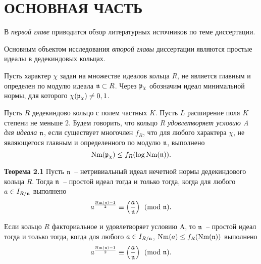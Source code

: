 \documentclass[_00_autoref.tex]{subfiles}
\begin{document}
{\let\clearpage\relax\vspace{2.2ex}
\chapter*{\MakeUppercase{ОСНОВНАЯ ЧАСТЬ}}\vspace{-2ex}}

В \emph{первой главе} приводится обзор литературных источников по теме диссертации.

Основным объектом исследования \emph{второй главы} диссертации являются простые идеалы в дедекиндовых кольцах.



Пусть характер $\chi$ задан на множестве идеалов кольца $R$, не является главным и определен по модулю идеала $\mathfrak{n} \subset R$.
Через $\mathfrak{p}_{\chi}$ обозначим идеал минимальной нормы, для которого $\chi(\mathfrak{p}_{\chi}) \neq 0, 1$.

Пусть $R$ дедекиндово кольцо с полем частных $K$.
Пусть $L$ расширение поля $K$ степени не меньше $2$.
Будем говорить, что кольцо $R$ \emph{удовлетворяет условию A для идеала $\mathfrak{n}$}, если существует многочлен $f_R$, что для любого характера $\chi$, не являющегося главным и определенного по модулю $\mathfrak{n}$, выполнено
\begin{equation*}
    \textrm{Nm}(\mathfrak{p}_{\chi}) \le f_R(\log{\textrm{Nm}(\mathfrak{n})}).
\end{equation*}

\textbf{Теорема 2.1}\label{theorem:euler_criteria}
    Пусть $\mathfrak{n}$~-- нетривиальный идеал нечетной нормы дедекиндового кольца $R$.
    Тогда $\mathfrak{n}$~-- простой идеал тогда и только тогда, когда для любого $a \in I_{R/\mathfrak{n}}$ выполнено
    \begin{equation*}
        a^{\frac{\textrm{Nm}(\mathfrak{n}) - 1}{2}} \equiv \left(\frac{a}{\mathfrak{n}}\right) \pmod{\mathfrak{n}}.
    \end{equation*}

    Если кольцо $R$ факториальное и удовлетворяет условию A, то $\mathfrak{n}$~-- простой идеал тогда и только тогда, когда для любого $a \in I_{R/\mathfrak{n}}$, $\textrm{Nm}(a) \le f_R(\textrm{Nm}(\mathfrak{n}))$ выполнено
    \begin{equation*}
        a^{\frac{\textrm{Nm}(\mathfrak{n}) - 1}{2}} \equiv \left(\frac{a}{\mathfrak{n}}\right) \pmod{\mathfrak{n}}.
    \end{equation*}
\end{document}
